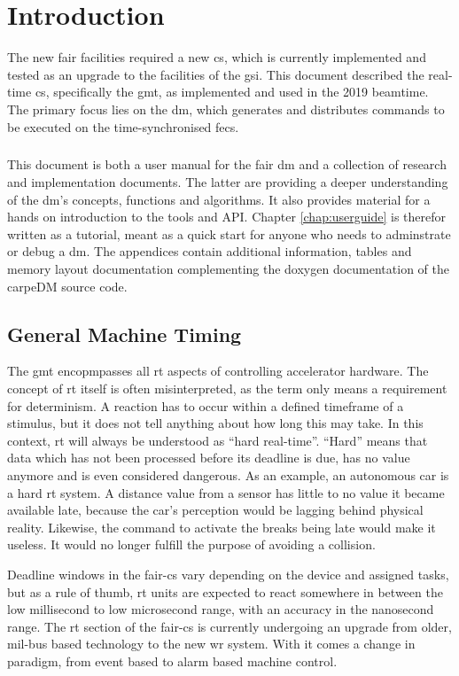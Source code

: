 
\chapter{Introduction}
\glsresetall


The new \gls{fair} facilities required a new \gls{cs}, which is currently implemented and tested as an upgrade to the facilities of the \gls{gsi}. This document described the real-time \gls{cs}, specifically the \gls{gmt}, as implemented and used in the 2019 beamtime. The primary focus lies on the \gls{dm}, which generates and distributes commands to be executed on the time-synchronised \gls{fec}s.
\paragraph{}
This document is both a user manual for the \gls{fair} \gls{dm} and a collection of research and implementation documents. The latter are providing a deeper understanding of the \gls{dm}'s concepts, functions and algorithms. It also provides material for a hands on introduction to the tools and API. Chapter \ref{chap:userguide} is therefor written as a tutorial, meant as a quick start for anyone who needs to adminstrate or debug a \gls{dm}. The appendices contain additional information, tables and memory layout documentation complementing the doxygen documentation of the carpeDM source code.

\section{General Machine Timing}

The \gls{gmt} encopmpasses all \gls{rt} aspects of controlling accelerator hardware. The concept of \gls{rt} itself is often misinterpreted, as the term only means a requirement for determinism. A reaction has to occur within a defined timeframe of a stimulus, but it does not tell anything about how long this may take. In this context, \gls{rt} will always be understood as \enquote{hard real-time}. \enquote{Hard} means that data which has not been processed before its deadline is due, has no value anymore and is even considered dangerous. As an example, an autonomous car is a hard \gls{rt} system. A distance value from a sensor has little to no value it became available late, because the car's perception would be lagging behind physical reality. Likewise, the command to activate the breaks being late would make it useless. It would no longer fulfill the purpose of avoiding a collision.
\par
Deadline windows in the \gls{fair}-\gls{cs} vary depending on the device and assigned tasks, but as a rule of thumb, \gls{rt} units are expected to react somewhere in between the low millisecond to low microsecond range, with an accuracy in the nanosecond range. The \gls{rt} section of the \gls{fair}-\gls{cs} is currently undergoing an upgrade from older, \gls{mil}-bus based technology to the new \gls{wr} system. With it comes a change in paradigm, from event based to alarm based machine control.


